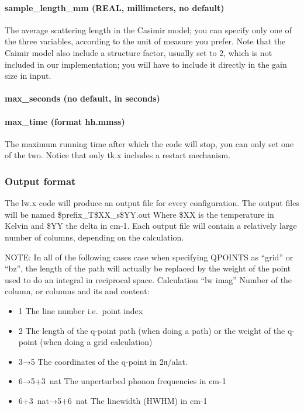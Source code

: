 \documentclass[
]{article}
\providecommand{\tightlist}{%
  \setlength{\itemsep}{0pt}\setlength{\parskip}{0pt}}
\begin{document}
\hypertarget{sample_length_mm-real-millimeters-no-default}{%
\paragraph{sample\_length\_mm (REAL, millimeters, no
default)}\label{sample_length_mm-real-millimeters-no-default}}

The average scattering length in the Casimir model; you can specify only
one of the three variables, according to the unit of measure you prefer.
Note that the Caimir model also include a structure factor, usually set
to 2, which is not included in our implementation; you will have to
include it directly in the gain size in input.

\hypertarget{max_seconds-no-default-in-seconds}{%
\paragraph{max\_seconds (no default, in
seconds)}\label{max_seconds-no-default-in-seconds}}

\hypertarget{max_time-format-hh.mmss}{%
\paragraph{max\_time (format hh.mmss)}\label{max_time-format-hh.mmss}}

The maximum running time after which the code will stop, you can only
set one of the two. Notice that only tk.x includes a restart mechanism.

\hypertarget{output-format-2}{%
\subsubsection{Output format}\label{output-format-2}}

The lw.x code will produce an output file for every configuration. The
output files will be named \$prefix\_T\$XX\_s\$YY.out Where \$XX is the
temperature in Kelvin and \$YY the delta in cm-1. Each output file will
contain a relatively large number of columns, depending on the
calculation.

NOTE: In all of the following cases case when specifying QPOINTS as
\enquote{grid} or \enquote{bz}, the length of the path will actually be
replaced by the weight of the point used to do an integral in reciprocal
space. Calculation \enquote{lw imag} Number of the column, or columns
and its and content:

\begin{itemize}
\tightlist
\item
  1 The line number i.e.~point index
\item
  2 The length of the q-point path (when doing a path) or the weight of
  the q-point (when doing a grid calculation)
\item
  3→5 The coordinates of the q-point in 2π/alat.
\item
  6→5+3~nat The unperturbed phonon frequencies in cm-1
\item
  6+3~nat→5+6~nat The linewidth (HWHM) in cm-1
\end{itemize}
\end{document}
